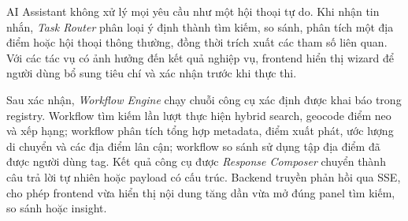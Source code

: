 \documentclass[12pt, a4paper]{article}
\begin{document}
AI Assistant không xử lý mọi yêu cầu như một hội thoại tự do. Khi nhận tin nhắn, \textit{Task Router} phân loại ý định thành tìm kiếm, so sánh, phân tích một địa điểm hoặc hội thoại thông thường, đồng thời trích xuất các tham số liên quan. Với các tác vụ có ảnh hưởng đến kết quả nghiệp vụ, frontend hiển thị wizard để người dùng bổ sung tiêu chí và xác nhận trước khi thực thi.

Sau xác nhận, \textit{Workflow Engine} chạy chuỗi công cụ xác định được khai báo trong registry. Workflow tìm kiếm lần lượt thực hiện hybrid search, geocode điểm neo và xếp hạng; workflow phân tích tổng hợp metadata, điểm xuất phát, ước lượng di chuyển và các địa điểm lân cận; workflow so sánh sử dụng tập địa điểm đã được người dùng tag. Kết quả công cụ được \textit{Response Composer} chuyển thành câu trả lời tự nhiên hoặc payload có cấu trúc. Backend truyền phản hồi qua SSE, cho phép frontend vừa hiển thị nội dung tăng dần vừa mở đúng panel tìm kiếm, so sánh hoặc insight.
\end{document}
